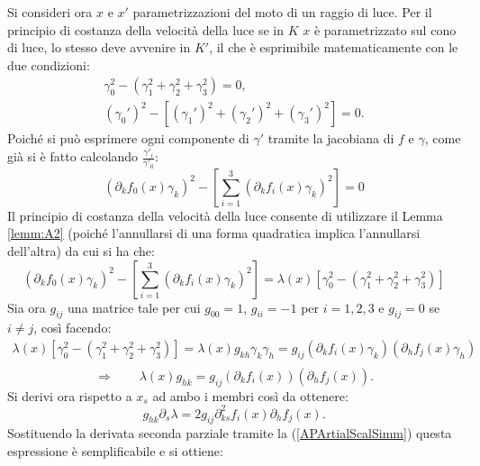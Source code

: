 Si consideri ora $x$ e $x'$ parametrizzazioni del moto di un raggio di luce. Per il principio di costanza della velocità della luce se in $K$ $x$ è parametrizzato sul cono di luce, lo stesso deve avvenire in $K'$, il che è esprimibile matematicamente con le due condizioni:
\begin{equation*}
    \begin{gathered}
        \gamma_0^2-(\gamma_1^2+\gamma_2^2+\gamma_3^2)=0,\\
        (\gamma_0')^2-[(\gamma_1')^2+(\gamma_2')^2+(\gamma_3')^2]=0.
    \end{gathered}
\end{equation*}
Poiché si può esprimere ogni componente di $\gamma'$ tramite la jacobiana di $f$ e $\gamma$, come già si è fatto calcolando $\frac{\gamma'_i}{\gamma'_0}$:
\begin{equation*}
    \left(\partial_kf_0(x)\gamma_k\right)^2-\left[\sum_{i=1}^3\left(\partial_kf_i(x)\gamma_k\right)^2\right]=0
\end{equation*}
Il principio di costanza della velocità della luce consente di utilizzare il Lemma \ref{lemm:A2} (poiché l'annullarsi di una forma quadratica implica l'annullarsi dell'altra) da cui si ha che:
\begin{equation*}
    \left(\partial_kf_0(x)\gamma_k\right)^2-\left[\sum_{i=1}^3\left(\partial_kf_i(x)\gamma_k\right)^2\right]=
    \lambda(x)\left[\gamma_0^2-(\gamma_1^2+\gamma_2^2+\gamma_3^2)\right]
\end{equation*}
Sia ora $g_{ij}$ una matrice tale per cui $g_{00}=1$, $g_{ii}=-1$ per $i=1,2,3$ e $g_{ij}=0$ se $i\neq j$, così facendo:
\begin{equation*}
    \begin{gathered}
        \lambda(x)\left[\gamma_0^2-(\gamma_1^2+\gamma_2^2+\gamma_3^2)\right]= 
        \lambda(x)g_{kh}\gamma_k\gamma_h=g_{ij}(\partial_kf_i(x)\gamma_k)(\partial_hf_j(x)\gamma_h)\\
    \end{gathered}
\end{equation*}
\begin{equation}
   \Rightarrow\qquad \lambda(x)g_{hk}=g_{ij}(\partial_kf_i(x))(\partial_hf_j(x)).
    \label{APartialDelta}
\end{equation}
Si derivi ora rispetto a $x_s $ ad ambo i membri così da ottenere:
\begin{equation*}
    g_{hk} \partial_s\lambda =2g_{ij}\partial_{ks}^2f_i(x)\partial_hf_j(x).
\end{equation*}
Sostituendo la derivata seconda parziale tramite la (\ref{APArtialScalSimm}) questa espressione è semplificabile e si ottiene:
